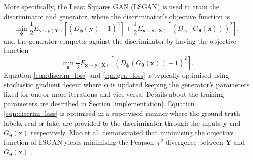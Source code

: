 More specifically, the Least Squares GAN (LSGAN) \citep{mao2016least} is used to train the discriminator and generator, where the discriminator's objective function is
\begin{equation}
	\label{eqn:discrim_loss}
    \min_\mathbf{\phi} \frac{1}{2}E_{\mathbf{y}\sim p(\mathbf{Y})}[(D_\mathbf{\phi} (\mathbf{y}) - 1)^2] + \frac{1}{2}E_{\mathbf{x}\sim p(\mathbf{X})}[(D_\mathbf{\phi} (G_\mathbf{\theta}(\mathbf{x})))^2],
\end{equation}
and the generator competes against the discriminator by having the objective function
\begin{equation}
	\label{eqn:gen_loss}
    \min_\mathbf{\theta} \frac{1}{2}E_{\mathbf{x}\sim p(\mathbf{X})}[(D_\mathbf{\phi} (G_\mathbf{\theta}(\mathbf{x}))-1)^2].
\end{equation}
Equation \ref{eqn:discrim_loss} and \ref{eqn:gen_loss} is typically optimised using stochastic gradient decent where $\mathbf{\phi}$ is updated keeping the generator's parameters fixed for one or more iterations and vice versa. Details about the training parameters are described in Section \ref{implementation}.  Equation \ref{eqn:discrim_loss} is optimised in a supervised manner where the ground truth labels, real or fake, are provided to the discriminator through the inputs $\mathbf{y}$ and $G_\mathbf{\theta}(\mathbf{x})$ respectively. Mao et al. demonstrated that minimising the objective function of LSGAN yields minimising the Pearson $\chi^2$ divergence between $\mathbf{Y}$ and $G_\mathbf{\theta}(\mathbf{x})$ \citep{mao2016least}.

\begin{comment}
The discriminator learns a decision boundary between real and fake samples and although some fake samples might be correctly classified, Equation \ref{eqn:discrim_loss} penalises samples further away from the decision boundary. Since $\mathbf{\phi}$ is fixed when updating the generator, the the decision boundary learned by the discriminator is also kept fixed. The dependence between the generator on the discriminator for learning (Equation \ref{eqn:gen_loss}) encourages the generator to produce samples closer to the decision boundary. On the next iteration, this causes the discriminator to update its decision boundary closer to the real data's manifold. The process repeats, making the decision boundary to pass through the real data manifold and the generated samples closer to the manifold of real data.
\end{comment}

